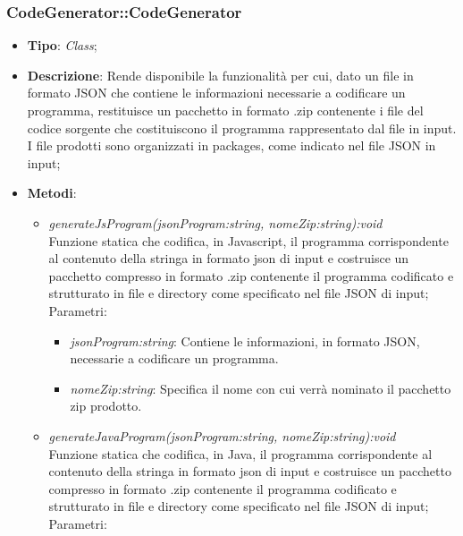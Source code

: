 \documentclass[../DefinizioneDiProdotto.tex]{subfiles}
\begin{document}
			\subsubsection{CodeGenerator::CodeGenerator}
			\hypertarget{SWEDesigner::Server::CodeGenerator::CodeGenerator}{}
			\begin{itemize}
				\item \textbf{Tipo}: \emph{Class};\\
				\item \textbf{Descrizione}: Rende disponibile la funzionalità per cui, dato un file in formato JSON che contiene le informazioni necessarie a codificare un programma, restituisce un pacchetto in formato .zip contenente i file del codice sorgente che costituiscono il programma rappresentato dal file in input. I file prodotti sono organizzati in packages, come indicato nel file JSON in input;\\
				\item \textbf{Metodi}:
				\begin{itemize}
					\item \emph{generateJsProgram(jsonProgram:string, nomeZip:string):void} \\ 
					Funzione statica che codifica, in Javascript, il programma corrispondente al contenuto della stringa in formato json di input e costruisce un pacchetto compresso in formato .zip contenente
					il programma codificato e strutturato in file e directory come specificato nel file JSON di input; \\
					Parametri:
					\begin{itemize}
						\item \emph{jsonProgram:string}: Contiene le informazioni, in formato JSON, necessarie a codificare un programma.\\
						\item \emph{nomeZip:string}: Specifica il nome con cui verrà nominato il pacchetto zip prodotto.\\
					\end{itemize}					
					\item \emph{generateJavaProgram(jsonProgram:string, nomeZip:string):void} \\ 
					Funzione statica che codifica, in Java, il programma corrispondente al contenuto della stringa in formato json di input e costruisce un pacchetto compresso in formato .zip contenente il programma codificato e strutturato in file e directory come specificato nel file JSON di input; \\							
					Parametri:

\end{itemize}
\end{itemize}
\end{document}
